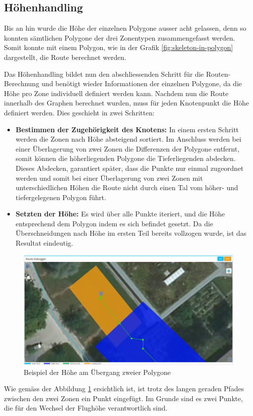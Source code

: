 \subsection{Höhenhandling}
Bis an hin wurde die Höhe der einzelnen Polygone ausser acht gelassen, denn so konnten sämtlichen Polygone der drei Zonentypen zusammengefasst werden. Somit konnte mit einem Polygon, wie in der Grafik \ref{fig:skeleton-in-polygon} dargestellt, die Route berechnet werden.

Das Höhenhandling bildet nun den abschliessenden Schritt für die Routen-Berechnung und benötigt wieder Informationen der einzelnen Polygone, da die Höhe pro Zone individuell definiert werden kann.
Nachdem nun die Route innerhalb des Graphen berechnet wurden, muss für jeden Knotenpunkt die Höhe definiert werden. Dies geschieht in zwei Schritten:
\begin{itemize}
	\item{\textbf{Bestimmen der Zugehörigkeit des Knotens:} In einem ersten Schritt werden die Zonen nach Höhe absteigend sortiert. Im Anschluss werden bei einer Überlagerung von zwei Zonen die Differenzen der Polygone entfernt, somit können die höherliegenden Polygone die Tieferliegenden abdecken. Dieses Abdecken, garantiert später, dass die Punkte nur einmal zugeordnet werden und somit bei einer Überlagerung von zwei Zonen mit unterschiedlichen Höhen die Route nicht durch einen Tal vom höher- und tiefergelegenen Polygon führt.}
	\item{\textbf{Setzten der Höhe:} Es wird über alle Punkte iteriert, und die Höhe entsprechend dem Polygon indem es sich befindet gesetzt. Da die Überschneidungen nach Höhe im ersten Teil bereits vollzogen wurde, ist das Resultat eindeutig.}
\end{itemize}
\begin{figure}[h]
	\centering
	\includegraphics[width=1.0\textwidth]{images/routing/height_example.png}
	\caption{Beispiel der Höhe am Übergang zweier Polygone}
	\label{fig:polygon-border-example}
\end{figure}
Wie gemäss der Abbildung \ref{fig:polygon-border-example} ersichtlich ist, ist trotz des langen geraden Pfades zwischen den zwei Zonen ein Punkt eingefügt. Im Grunde sind es zwei Punkte, die für den Wechsel der Flughöhe verantwortlich sind.
\newpage
